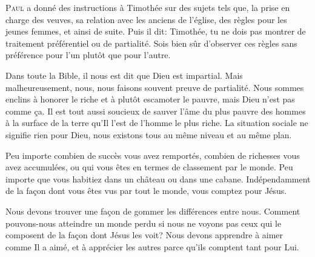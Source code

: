 
\lettrine{P}{aul} a donné des instructions à Timothée
 sur des sujets tels que, la prise en charge des veuves,
 sa relation avec les anciens de l'église, des règles pour les jeunes femmes,
 et ainsi de suite. Puis il dit: 
 \Og Timothée, 
 tu ne dois pas montrer de traitement préférentiel ou de partialité.
 Sois bien sûr d'observer ces règles sans préférence pour l'un plutôt
 que pour l'autre. \Fg{}

Dans toute la Bible, il nous est dit que Dieu est impartial.
 Mais malheureusement, nous, nous faisons souvent preuve de partialité.
 Nous sommes enclins à honorer le riche et à plutôt escamoter le pauvre,
 mais Dieu n'est pas comme \c{c}a. Il est tout aussi soucieux de sauver l'âme
 du plus pauvre des hommes à la surface de la terre qu'Il l'est de l'homme
 le plus riche. La situation sociale ne signifie rien pour Dieu,
 nous existons tous au même niveau et au même plan. 


Peu importe combien de succès vous avez remportés, combien de richesses
 vous avez accumulées, ou qui vous êtes en termes de classement par le monde.
 Peu importe que vous habitiez dans un château ou dans une cabane.
 Indépendamment de la fa\c{c}on dont vous êtes vus par tout le monde,
 vous comptez pour Jésus. 

Nous devons trouver une fa\c{c}on de gommer les différences entre nous.
 Comment pouvons-nous atteindre un monde perdu si nous ne voyons pas
 ceux qui le composent de la fa\c{c}on dont Jésus les voit?
 Nous devons apprendre à aimer comme Il a aimé, et à apprécier les autres
 parce qu'ils comptent tant pour Lui.

\dvrule







